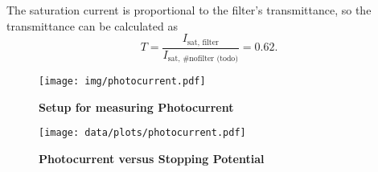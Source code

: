 The saturation current is proportional to the filter's transmittance, so the transmittance can be calculated as
\begin{equation*}
	T = \frac{I_\text{sat, filter}}{I_\text{sat, \#nofilter (todo)}} = \num{0.62}.
\end{equation*}

\begin{figure}[tbp]
	\centering
	\texttt{[image: img/photocurrent.pdf]}
	\caption[Setup for measuring Photocurrent]{\textbf{Setup for measuring Photocurrent}}
	\label{sch:photocurrent}
\end{figure}

\begin{figure}[tbp]
	\centering
	\texttt{[image: data/plots/photocurrent.pdf]}
	\caption[Photocurrent versus Stopping Potential]{\textbf{Photocurrent versus Stopping Potential}}
	\label{plt:photocurrent}
\end{figure}
